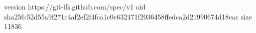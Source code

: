 version https://git-lfs.github.com/spec/v1
oid sha256:52d55a9f271c4af2ef2f4fca1c0e632471f2036458ffedca2d21990674d18eac
size 11836
